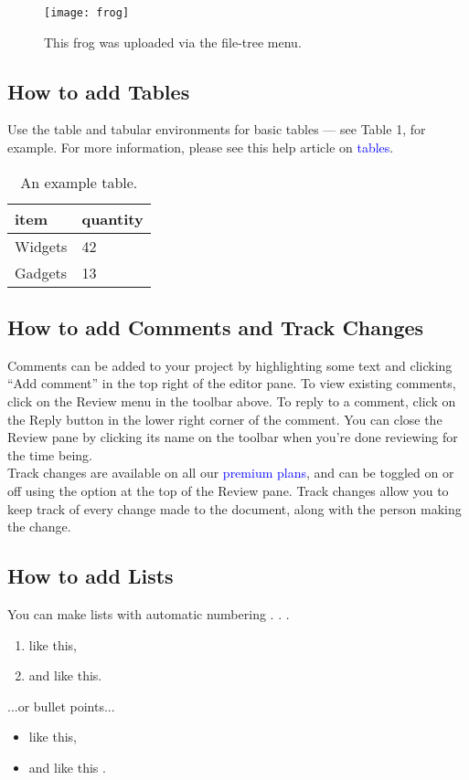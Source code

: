 \documentclass{article}
\begin{document}
	
		\begin{figure}[bp]
			\centering
			\texttt{[image: frog]}
			\caption{This frog was uploaded via the file-tree menu.}
		\end{figure}

\subsection{How to add Tables}
Use the table and tabular environments for basic tables — see Table 1, for example. For more information, please see this help article on \textcolor{blue}{tables}.
\begin{table}
	\centering
	\begin{tabular}{l|l}
		item & quantity  \\
		\hline
		Widgets & 42 \\
		Gadgets & 13
	\end{tabular}
	\caption{ An example table.}
\end{table}
\subsection{How to add Comments and Track Changes}
Comments can be added to your project by highlighting some text and clicking “Add comment” in
the top right of the editor pane. To view existing comments, click on the Review menu in the toolbar
above. To reply to a comment, click on the Reply button in the lower right corner of the comment.
You can close the Review pane by clicking its name on the toolbar when you’re done reviewing for the
time being.\\
Track changes are available on all our \textcolor{blue}{premium plans}, and can be toggled on or off using the option
at the top of the Review pane. Track changes allow you to keep track of every change made to the
document, along with the person making the change.

\subsection{How to add Lists}
You can make lists with automatic numbering . . .\\

\begin{enumerate}
	\item like this,
	\item and like this.
\end{enumerate}
...or bullet points...
\begin{itemize}
	\item like this,
	\item and like this .
	\end{itemize}
\end{document}
